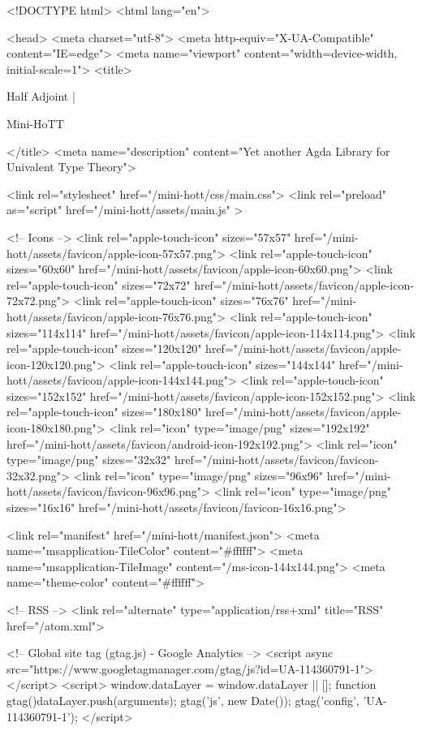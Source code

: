<!DOCTYPE html>
<html lang="en">

<head>
  <meta charset="utf-8">
  <meta http-equiv="X-UA-Compatible" content="IE=edge">
  <meta name="viewport" content="width=device-width, initial-scale=1">
  <title>
    
      
        Half Adjoint |
      
        Mini-HoTT
    
  </title>
  <meta name="description" content="Yet another Agda Library for Univalent Type Theory">

  <link rel="stylesheet" href="/mini-hott/css/main.css">
  <link rel="preload" as="script" href="/mini-hott/assets/main.js" >

  <!-- Icons -->
  <link rel="apple-touch-icon" sizes="57x57" href="/mini-hott/assets/favicon/apple-icon-57x57.png">
  <link rel="apple-touch-icon" sizes="60x60" href="/mini-hott/assets/favicon/apple-icon-60x60.png">
  <link rel="apple-touch-icon" sizes="72x72" href="/mini-hott/assets/favicon/apple-icon-72x72.png">
  <link rel="apple-touch-icon" sizes="76x76" href="/mini-hott/assets/favicon/apple-icon-76x76.png">
  <link rel="apple-touch-icon" sizes="114x114" href="/mini-hott/assets/favicon/apple-icon-114x114.png">
  <link rel="apple-touch-icon" sizes="120x120" href="/mini-hott/assets/favicon/apple-icon-120x120.png">
  <link rel="apple-touch-icon" sizes="144x144" href="/mini-hott/assets/favicon/apple-icon-144x144.png">
  <link rel="apple-touch-icon" sizes="152x152" href="/mini-hott/assets/favicon/apple-icon-152x152.png">
  <link rel="apple-touch-icon" sizes="180x180" href="/mini-hott/assets/favicon/apple-icon-180x180.png">
  <link rel="icon" type="image/png" sizes="192x192"  href="/mini-hott/assets/favicon/android-icon-192x192.png">
  <link rel="icon" type="image/png" sizes="32x32" href="/mini-hott/assets/favicon/favicon-32x32.png">
  <link rel="icon" type="image/png" sizes="96x96" href="/mini-hott/assets/favicon/favicon-96x96.png">
  <link rel="icon" type="image/png" sizes="16x16" href="/mini-hott/assets/favicon/favicon-16x16.png">

  <link rel="manifest" href="/mini-hott/manifest.json">
  <meta name="msapplication-TileColor" content="#ffffff">
  <meta name="msapplication-TileImage" content="/ms-icon-144x144.png">
  <meta name="theme-color" content="#ffffff">

  <!-- RSS -->
  <link rel="alternate" type="application/rss+xml" title="RSS" href="/atom.xml">

  <!-- Global site tag (gtag.js) - Google Analytics -->
  <script async src="https://www.googletagmanager.com/gtag/js?id=UA-114360791-1"></script>
  <script>
    window.dataLayer = window.dataLayer || [];
    function gtag(){dataLayer.push(arguments);}
    gtag('js', new Date());
    gtag('config', 'UA-114360791-1');
  </script>

